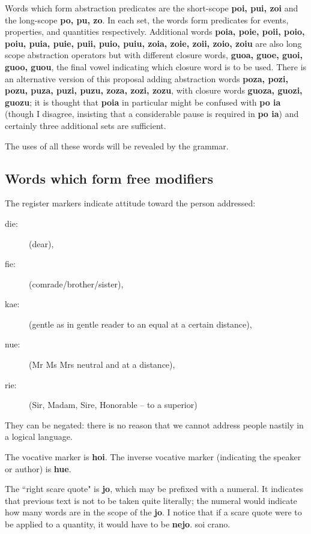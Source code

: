 \documentclass[12pt]{book}
\begin{document}
{Words which form abstraction predicates are the short-scope {\bf poi, pui, zoi} and the long-scope {\bf po, pu, zo}.  In each set, the words form predicates for events, properties, and quantities respectively.  Additional words {\bf poia, poie, poii, poio, poiu, puia, puie, puii, puio, puiu, zoia, zoie, zoii, zoio, zoiu} are also long scope abstraction operators but with different closure words, {\bf guoa, guoe, guoi, guoo, guou}, the final vowel indicating which closure word is to be used.  There is an alternative version of this proposal adding abstraction words {\bf poza, pozi, pozu, puza, puzi, puzu, zoza, zozi, zozu}, with closure words {\bf guoza, guozi, guozu}; it is thought that {\bf poia} in particular might be confused with {\bf po ia} (though I disagree, insisting that a considerable pause is required in {\bf po ia}) and certainly three additional sets are sufficient.


The uses of all these words will be revealed by the grammar.

\subsection{Words which form free modifiers}

The register markers indicate attitude toward the person addressed:  

\begin{description}

\item[die:] (dear), \item[fie:] (comrade/brother/sister), \item[kae:] (gentle as in gentle reader to an equal at a certain distance), \item[nue:] (Mr Ms Mrs neutral and at a distance),\item[rie:] (Sir, Madam, Sire, Honorable -- to a superior)

\end{description}   They can be negated:  there is no reason that we cannot address people nastily in a logical language.

The vocative marker is {\bf hoi}.   The inverse vocative marker (indicating the speaker or author) is {\bf hue}.

The ``right scare quote" is {\bf jo}, which may be prefixed with a numeral.   It indicates that previous text is not to be taken quite literally; the numeral would indicate
how many words are in the scope of the {\bf jo}.   I notice that if a scare quote were to be applied to a quantity, it would have to be {\bf nejo}. soi crano.

}
\end{document}
